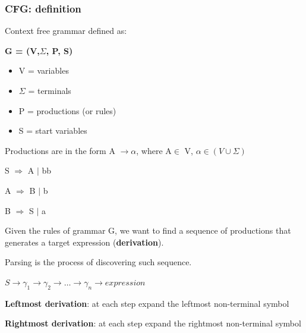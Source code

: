 \begin{frame}
    \frametitle{CFG: definition}
    Context free grammar defined as:
    \begin{center}
        \textbf{G = (V,$\Sigma$, P, S)}
    \end{center}
    \begin{itemize}
        \item V = variables
        \item $\Sigma$ = terminals
        \item P = productions (or rules)
        \item S = start variables
    \end{itemize}
    Productions are in the form A $\rightarrow \alpha$, where A$\in$ V, $\alpha \in (V \cup \Sigma)$

    S $\Rightarrow$ A $|$ bb
    
    A $\Rightarrow$ B $|$ b 
   
    B $\Rightarrow$ S $|$ a
\end{frame}
\begin{frame}
    
        \begin{block}{}
        Given the rules of grammar G, we want to find a sequence of productions that 
        generates a target expression (\textbf{derivation}).
    
        
        \end{block}
        \begin{block}{}
        Parsing is the process of discovering such sequence.
        \end{block}
        
        $ S \rightarrow \gamma_{1} \rightarrow \gamma_{2} \rightarrow \dots \rightarrow \gamma_{n} \rightarrow expression$
        
        \begin{block}{}\textbf{Leftmost derivation}: at each step expand the leftmost non-terminal symbol\end{block}
        
        \begin{block}{}\textbf{Rightmost derivation}: at each step expand the rightmost non-terminal symbol\end{block}
        
\end{frame}
